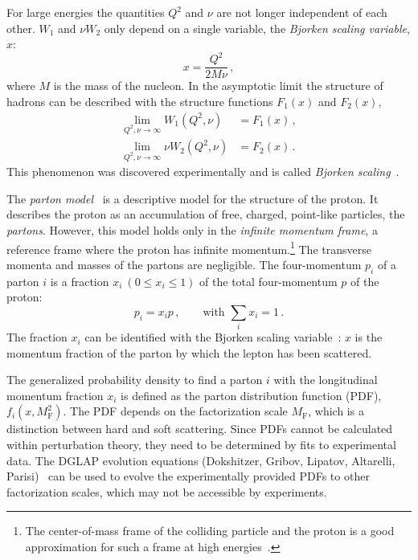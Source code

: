For large energies the quantities $Q^2$ and $\nu$ are not longer independent of each other.
$W_1$ and $\nu W_2$ only depend on a single variable, the \emph{Bjorken scaling variable}, $x$:
\begin{equation}
    x = \frac{Q^2}{2 M \nu} \,,
\end{equation}
where $M$ is the mass of the nucleon.
In the asymptotic limit the structure of hadrons can be described with the structure functions $F_1(x)$ and $F_2(x)$,
\begin{equation}
    \begin{split}
        \lim_{Q^2, \nu \to \infty} W_1(Q^2, \nu) &= F_1(x) \,, \\
        \lim_{Q^2, \nu \to \infty} \nu W_2(Q^2, \nu) &= F_2(x) \,.
    \end{split}
\end{equation}
This phenomenon was discovered experimentally and is called \emph{Bjorken scaling}~\cite{bjo:scaling}.

The \emph{parton model}~\cite{feyn69,bjo:epscattering} is a descriptive model for the structure of the proton.
It describes the proton as an accumulation of free, charged, point-like particles, the \emph{partons}.
However, this model holds only in the \emph{infinite momentum frame}, a reference frame where the proton has infinite
momentum.\footnote{The center-of-mass frame of the colliding particle and the proton is a good approximation
for such a frame at high energies~\cite{bjo:epscattering}.}
The transverse momenta and masses of the partons are negligible.
The four-momentum $p_i$ of a parton $i$ is a fraction $x_i \ (0 \leq x_i \leq 1)$ of the total four-momentum $p$ of the proton:
\begin{equation}
    p_i = x_i p\,, \qquad\text{with } \sum_i x_i = 1\,.
\end{equation}
The fraction $x_i$ can be identified with the Bjorken scaling variable~\cite{bjo:epscattering}: $x$ is the momentum fraction of the parton
by which the lepton has been scattered.

The generalized probability density to find a parton $i$ with the longitudinal momentum fraction $x_i$ is defined as the
parton distribution function (PDF), $f_i(x, M_\text{F}^2)$.
The PDF depends on the factorization scale $M_\text{F}$, which is a distinction between hard and soft scattering.
Since PDFs cannot be calculated within perturbation theory, they need to be determined by fits to experimental data.
The DGLAP evolution equations (Dokshitzer, Gribov, Lipatov, Altarelli, Parisi)~\cite{dglap:d, dglap:gl, dglap:ap}
can be used to evolve the experimentally provided PDFs to other factorization scales, which may not be accessible by experiments.

